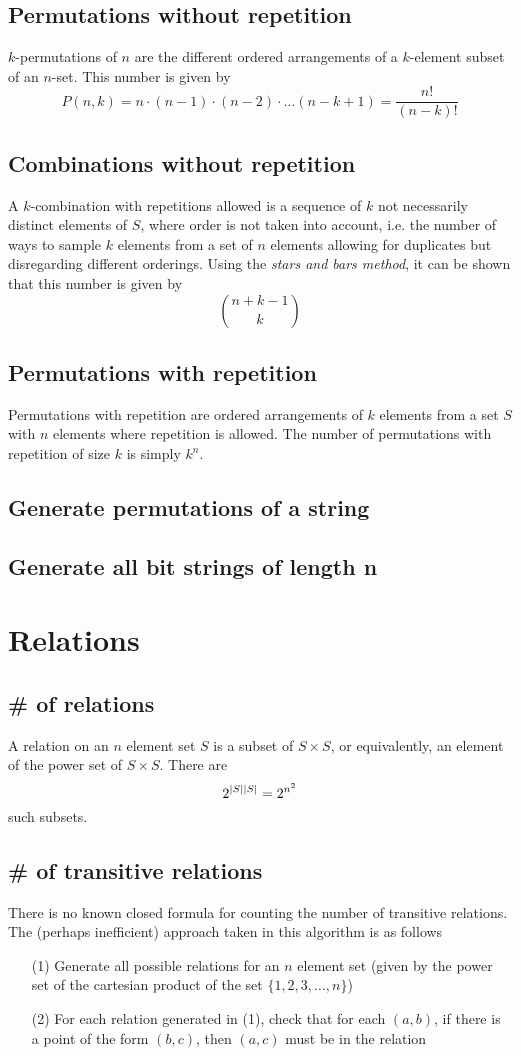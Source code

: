 \documentclass{article}
\begin{document}
\subsection{Permutations without repetition}
$k$-permutations of $n$ are the different ordered arrangements of a $k$-element subset of an $n$-set. This number is given by
\[P(n,k) = n \cdot (n-1) \cdot (n-2) \cdot \dots (n-k+1) = \frac{n!}{(n-k)!}\]
\subsection{Combinations without repetition}
A $k$-combination with repetitions allowed is a sequence of $k$ not necessarily distinct elements of $S$, where order is not taken into account, i.e. the number of ways to sample $k$ elements from a set of $n$ elements allowing for duplicates but disregarding different orderings. Using the \emph{stars and bars method}, it can be shown that this number is given by
\[{n+k-1 \choose k}\]

\subsection{Permutations with repetition}
Permutations with repetition are ordered arrangements of $k$ elements from a set $S$ with $n$ elements where repetition is allowed. The number of permutations with repetition of size $k$ is simply $k^n$.
\subsection{Generate permutations of a string}
\subsection{Generate all bit strings of length n}

\section{Relations}
\subsection{\# of relations}
A relation on an $n$ element set $S$ is a subset of $S \times S$, or equivalently, an element of the power set of $S \times S$. There are
\[2^{\,\abs{S}\,\abs{S}}=2^{n^2}\]
such subsets.
\subsection{\# of transitive relations}
There is no known closed formula for counting the number of transitive relations. The (perhaps inefficient) approach taken in this algorithm is as follows
\begin{enumerate}
\item[(1)] Generate all possible relations for an $n$ element set (given by the power set of the cartesian product of the set $\{1,2,3,\dots,n\}$)
\item[(2)] For each relation generated in (1), check that for each $(a,b)$, if there is a point of the form $(b,c)$, then $(a,c)$ must be in the relation
\end{enumerate}
\end{document}
